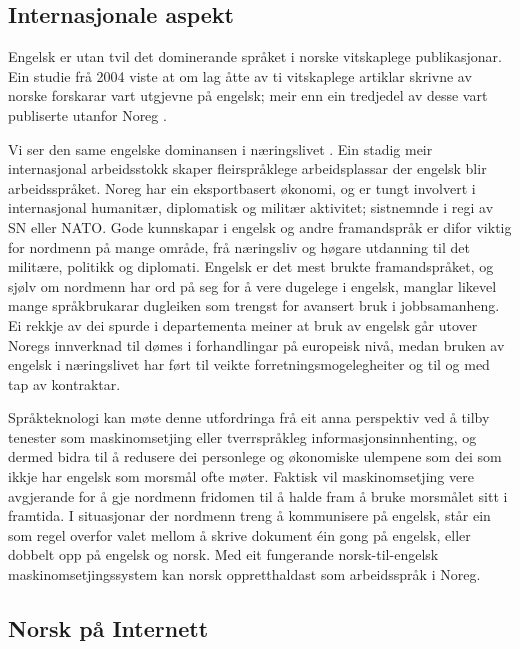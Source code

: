 \begin{multicols}{2}
\subsection{Internasjonale aspekt}

Engelsk er utan tvil det dominerande språket i norske vitskaplege publikasjonar. Ein studie frå 2004 viste at om lag åtte av ti vitskaplege artiklar skrivne av norske forskarar vart utgjevne på engelsk; meir enn ein tredjedel av desse vart publiserte utanfor Noreg \cite{schwach2004}.

Vi ser den same engelske dominansen i næringslivet \cite{SR:2010,Hel:2010}. 
Ein stadig meir internasjonal arbeidsstokk skaper fleirspråklege arbeidsplassar der engelsk blir arbeidsspråket. 
Noreg har ein eksportbasert økonomi, og er tungt involvert i internasjonal humanitær, diplomatisk og militær aktivitet; sistnemnde i regi av SN eller NATO. 
Gode kunnskapar i engelsk og andre framandspråk er difor viktig for nordmenn på mange område, frå næringsliv og høgare utdanning til det militære, politikk og diplomati. 
Engelsk er det mest brukte framandspråket, og sjølv om nordmenn har ord på seg for å vere dugelege i engelsk, manglar likevel mange språkbrukarar dugleiken som trengst for avansert bruk i jobbsamanheng. 
Ei rekkje av dei spurde i departementa meiner at bruk av engelsk går utover Noregs innverknad til dømes i forhandlingar på europeisk nivå, medan bruken av engelsk i næringslivet har ført til veikte forretningsmogelegheiter og til og med tap av kontraktar.


Språkteknologi kan møte denne utfordringa frå eit anna perspektiv ved å tilby tenester som maskinomsetjing eller tverrspråkleg informasjonsinnhenting, og dermed bidra til å redusere dei personlege og økonomiske ulempene som dei som ikkje har engelsk som morsmål ofte møter. 
Faktisk vil maskinomsetjing vere avgjerande for å gje nordmenn fridomen til å halde fram å bruke morsmålet sitt i framtida. 
I situasjonar der nordmenn treng å kommunisere på engelsk, står ein som regel overfor valet mellom å skrive dokument éin gong på engelsk, eller dobbelt opp på engelsk og norsk. 
Med eit fungerande norsk-til-engelsk maskinomsetjingssystem kan norsk oppretthaldast som arbeidsspråk i Noreg.

\subsection{Norsk på Internett}


\end{multicols}
